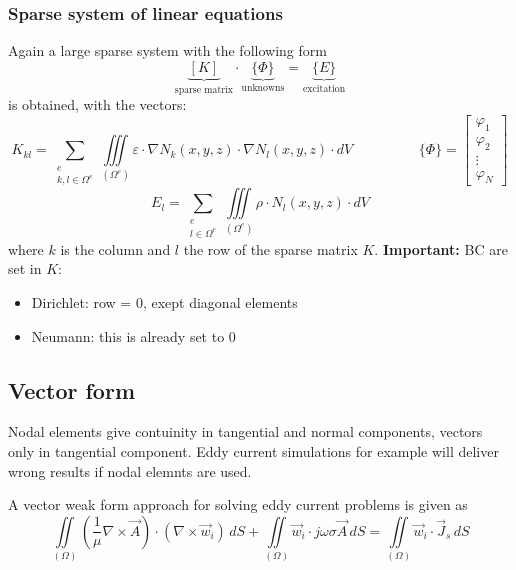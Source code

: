\subsubsection{Sparse system of linear equations}
Again a large sparse system with the following form
\begin{equation*}	
	\underbrace{\left[K\right]}_{\textrm{sparse matrix}} \cdot \underbrace{\{\Phi\}}_{\textrm{unknowns}} = \underbrace{\{E\}}_{\textrm{excitation}}
\end{equation*}
is obtained, with the vectors:
\begin{equation*}
	K_{kl} = \sum_{\substack{e\\k,l\in\Omega^e}} \iiint\limits_{\left(\Omega ^e\right)} \varepsilon \cdot \nabla N_k(x,y,z) \cdot \nabla N_l(x,y,z) \cdot dV
	\hspace{2cm}
	\{\Phi\} =
	\begin{bmatrix}
		\varphi_1 \\
		\varphi_2 \\ 
		\vdots \\
		\varphi_N
	\end{bmatrix}
\end{equation*}
\begin{equation*}
	E_l = \sum_{\substack{e\\l\in\Omega^e}} \iiint\limits_{\left(\Omega ^e\right)} \rho \cdot N_l(x,y,z) \cdot dV
\end{equation*}
where $k$ is the column and $l$ the row of the sparse matrix $K$. \newline \newline
\textbf{Important:} BC are set in $K$:
\begin{itemize}
	\item Dirichlet: row = 0, exept diagonal elements
	\item Neumann: this is already set to 0
\end{itemize}

\subsection{Vector form}
Nodal elements give contuinity in tangential and normal components, vectors only in tangential component. Eddy current simulations for example will deliver wrong results if nodal elemnts are used. \newline \newline

A vector weak form approach for solving eddy current problems is given as
\begin{equation*}
	\iint\limits_{\left(\Omega\right)} \left(\frac{1}{\mu}\nabla \times \vec{A}\right) \cdot \left(\nabla \times \vec{w}_i\right)\,dS + \iint\limits_{\left(\Omega\right)} \vec{w}_i \cdot j\omega\sigma\vec{A}\,dS = \iint\limits_{\left(\Omega\right)}\vec{w}_i \cdot \vec{J}_s\,dS
 \end{equation*}